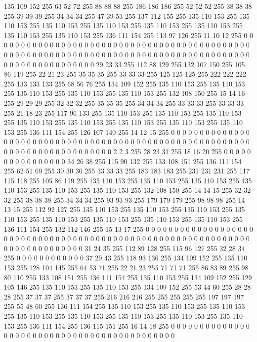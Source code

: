 135 109 152 255 63 52 72 255 88 88 88 255 186 186 186 255 52 52 52 255 38 38 38 255 39 39 39 255 34 34 34 255 47 39 53 255 137 112 155 255 135 110 153 255 135 110 153 255 135 110 153 255 135 110 153 255 135 110 153 255 135 110 153 255
135 110 153 255 135 110 153 255 136 111 154 255 113 97 126 255 11 10 12 255 0 0 0 0 0 0 0 0 0 0 0 0 0 0 0 0 0 0 0 0 0 0 0 0 0 0 0 0 0 0 0 0 0 0 0 0 0 0 0 0 0 0 0 0
0 0 0 0 0 0 0 0 0 0 0 0 0 0 0 0 0 0 0 0 0 0 0 0 0 0 0 0 0 0 0 0 0 0 0 0 0 0 0 0 0 0 0 0 0 0 0 0 0 0 0 0 0 0 0 0 0 0 0 0 29 23 33 255
112 88 129 255 132 107 150 255 105 86 119 255 22 21 23 255 35 35 35 255 33 33 33 255 125 125 125 255 222 222 222 255 133 133 133 255 68 56 76 255 134 109 152 255 135 110 153 255 135 110 153 255 135 110 153 255 135 110 153 255 135 110 153 255
132 108 150 255 15 14 16 255 29 29 29 255 32 32 32 255 35 35 35 255 34 34 34 255 33 33 33 255 33 33 33 255 21 18 23 255 117 96 133 255 135 110 153 255 135 110 153 255 135 110 153 255 135 110 153 255 135 110 153 255 135 110 153 255
135 110 153 255 135 110 153 255 136 111 154 255 126 107 140 255 14 12 15 255 0 0 0 0 0 0 0 0 0 0 0 0 0 0 0 0 0 0 0 0 0 0 0 0 0 0 0 0 0 0 0 0 0 0 0 0 0 0 0 0 0 0 0 0
0 0 0 0 0 0 0 0 0 0 0 0 0 0 0 0 0 0 0 0 0 0 0 0 0 0 0 0 0 0 0 0 2 2 3 255 28 23 31 255 18 16 20 255 0 0 0 0 0 0 0 0 0 0 0 0 0 0 0 0 34 26 38 255
115 90 132 255 133 108 151 255 136 111 154 255 62 51 69 255 30 30 30 255 33 33 33 255 183 183 183 255 231 231 231 255 117 115 118 255 105 86 119 255 135 110 153 255 135 110 153 255 135 110 153 255 135 110 153 255 135 110 153 255 135 110 153 255
132 108 150 255 14 14 15 255 32 32 32 255 38 38 38 255 34 34 34 255 93 93 93 255 179 179 179 255 98 98 98 255 14 13 15 255 112 92 127 255 135 110 153 255 135 110 153 255 135 110 153 255 135 110 153 255 135 110 153 255 135 110 153 255
135 110 153 255 135 110 153 255 136 111 154 255 132 112 146 255 15 13 17 255 0 0 0 0 0 0 0 0 0 0 0 0 0 0 0 0 0 0 0 0 0 0 0 0 0 0 0 0 0 0 0 0 0 0 0 0 0 0 0 0 0 0 0 0
0 0 0 0 0 0 0 0 0 0 0 0 0 0 0 0 0 0 0 0 0 0 0 0 0 0 0 0 0 0 0 0 31 24 35 255 112 89 128 255 115 96 127 255 32 28 34 255 0 0 0 0 0 0 0 0 0 0 0 0 37 29 43 255
118 93 136 255 134 109 152 255 135 110 153 255 128 104 145 255 64 53 71 255 22 21 23 255 71 71 71 255 86 83 89 255 98 80 110 255 133 108 151 255 136 111 154 255 135 110 153 255 134 109 152 255 129 105 146 255 135 110 153 255 135 110 153 255
134 109 152 255 53 44 60 255 28 28 28 255 37 37 37 255 37 37 37 255 216 216 216 255 255 255 255 255 197 197 197 255 55 48 60 255 136 111 154 255 135 110 153 255 135 110 153 255 135 110 153 255 135 110 153 255 135 110 153 255 135 110 153 255
135 110 153 255 135 110 153 255 136 111 154 255 136 115 151 255 16 14 18 255 0 0 0 0 0 0 0 0 0 0 0 0 0 0 0 0 0 0 0 0 0 0 0 0 0 0 0 0 0 0 0 0 0 0 0 0 0 0 0 0 0 0 0 0
